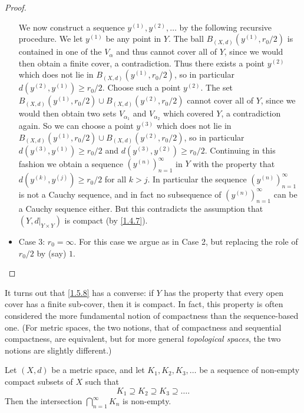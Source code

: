 \begin{proof}
\begin{itemize}
          We now construct a sequence \(y^{(1)}, y^{(2)}, \dots\) by the following recursive procedure.
          We let \(y^{(1)}\) be any point in \(Y\).
          The ball \(B_{(X, d)}(y^{(1)}, r_0 / 2)\) is contained in one of the \(V_{\alpha}\) and thus cannot cover all of \(Y\), since we would then obtain a finite cover, a contradiction.
          Thus there exists a point \(y^{(2)}\) which does not lie in \(B_{(X, d)}(y^{(1)}, r_0 / 2)\), so in particular \(d(y^{(2)}, y^{(1)}) \geq r_0 / 2\).
          Choose such a point \(y^{(2)}\).
          The set \(B_{(X, d)}(y^{(1)}, r_0 / 2) \cup B_{(X, d)}(y^{(2)}, r_0 / 2)\) cannot cover all of \(Y\), since we would then obtain two sets \(V_{\alpha_1}\) and \(V_{\alpha_2}\) which covered \(Y\), a contradiction again.
          So we can choose a point \(y^{(3)}\) which does not lie in \(B_{(X, d)}(y^{(1)}, r_0 / 2) \cup B_{(X, d)}(y^{(2)}, r_0 / 2)\), so in particular \(d(y^{(3)}, y^{(1)}) \geq r_0 / 2\) and \(d(y^{(3)}, y^{(2)}) \geq r_0 / 2\).
          Continuing in this fashion we obtain a sequence \((y^{(n)})_{n = 1}^\infty\) in \(Y\) with the property that \(d(y^{(k)}, y^{(j)}) \geq r_0 / 2\) for all \(k > j\).
          In particular the sequence \((y^{(n)})_{n = 1}^\infty\) is not a Cauchy sequence, and in fact no subsequence of \((y^{(n)})_{n = 1}^\infty\) can be a Cauchy sequence either.
          But this contradicts the assumption that \((Y, d|_{Y \times Y})\) is compact (by \cref{1.4.7}).
    \item Case 3:
          \(r_0 = \infty\).
          For this case we argue as in Case 2, but replacing the role of \(r_0 / 2\) by (say) \(1\).
  \end{itemize}
\end{proof}

\begin{note}
  It turns out that \cref{1.5.8} has a converse:
  if \(Y\) has the property that every open cover has a finite sub-cover, then it is compact.
  In fact, this property is often considered the more fundamental notion of compactness than the sequence-based one.
  (For metric spaces, the two notions, that of compactness and sequential compactness, are equivalent, but for more general \emph{topological spaces}, the two notions are slightly diﬀerent.)
\end{note}

\begin{cor}\label{1.5.9}
  Let \((X, d)\) be a metric space, and let \(K_1, K_2, K_3, \dots\) be a sequence of non-empty compact subsets of \(X\) such that
  \[
    K_1 \supseteq K_2 \supseteq K_3 \supseteq \dots.
  \]
  Then the intersection \(\bigcap_{n = 1}^\infty K_n\) is non-empty.
\end{cor}

